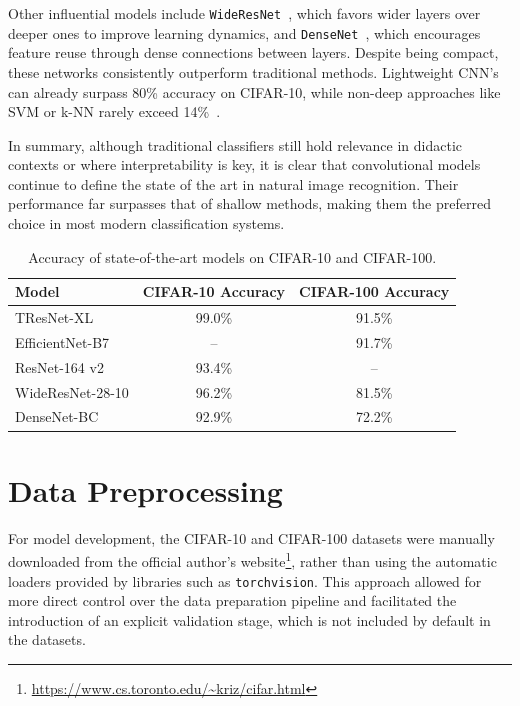 \documentclass[journal,article,submit,pdftex,moreauthors]{Definitions/mdpi}
\begin{document}
Other influential models include \texttt{WideResNet}~\cite{wideresnet}, which favors wider layers over deeper ones to improve learning dynamics, and \texttt{DenseNet}~\cite{densenet}, which encourages feature reuse through dense connections between layers. Despite being compact, these networks consistently outperform traditional methods. Lightweight CNN's can already surpass 80\% accuracy on CIFAR-10, while non-deep approaches like SVM or k-NN rarely exceed 14\%~\cite{researchgate1}.

In summary, although traditional classifiers still hold relevance in didactic contexts or where interpretability is key, it is clear that convolutional models continue to define the state of the art in natural image recognition. Their performance far surpasses that of shallow methods, making them the preferred choice in most modern classification systems.

\begin{table}[H]
\caption{Accuracy of state-of-the-art models on CIFAR-10 and CIFAR-100.\label{tab:accuracies_sota}}
\begin{tabularx}{\textwidth}{lCC}
\toprule
\textbf{Model} & \textbf{CIFAR-10 Accuracy} & \textbf{CIFAR-100 Accuracy} \\
\midrule
TResNet-XL        & 99.0\% & 91.5\% \\
EfficientNet-B7   & --     & 91.7\% \\
ResNet-164 v2     & 93.4\% & --     \\
WideResNet-28-10  & 96.2\% & 81.5\% \\
DenseNet-BC       & 92.9\% & 72.2\% \\
\bottomrule
\end{tabularx}
\end{table}

\section{Data Preprocessing}
\label{sec:data_processing}

For model development, the CIFAR-10 and CIFAR-100 datasets were manually downloaded from the official author's website\footnote{\url{https://www.cs.toronto.edu/~kriz/cifar.html}}, rather than using the automatic loaders provided by libraries such as \texttt{torchvision}. This approach allowed for more direct control over the data preparation pipeline and facilitated the introduction of an explicit validation stage, which is not included by default in the datasets.
\end{document}
